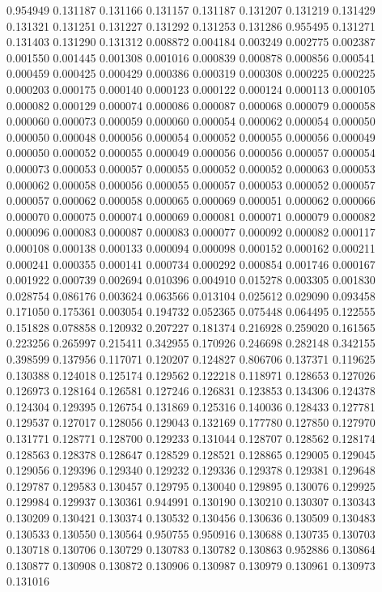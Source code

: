 0.954949
0.131187
0.131166
0.131157
0.131187
0.131207
0.131219
0.131429
0.131321
0.131251
0.131227
0.131292
0.131253
0.131286
0.955495
0.131271
0.131403
0.131290
0.131312
0.008872
0.004184
0.003249
0.002775
0.002387
0.001550
0.001445
0.001308
0.001016
0.000839
0.000878
0.000856
0.000541
0.000459
0.000425
0.000429
0.000386
0.000319
0.000308
0.000225
0.000225
0.000203
0.000175
0.000140
0.000123
0.000122
0.000124
0.000113
0.000105
0.000082
0.000129
0.000074
0.000086
0.000087
0.000068
0.000079
0.000058
0.000060
0.000073
0.000059
0.000060
0.000054
0.000062
0.000054
0.000050
0.000050
0.000048
0.000056
0.000054
0.000052
0.000055
0.000056
0.000049
0.000050
0.000052
0.000055
0.000049
0.000056
0.000056
0.000057
0.000054
0.000073
0.000053
0.000057
0.000055
0.000052
0.000052
0.000063
0.000053
0.000062
0.000058
0.000056
0.000055
0.000057
0.000053
0.000052
0.000057
0.000057
0.000062
0.000058
0.000065
0.000069
0.000051
0.000062
0.000066
0.000070
0.000075
0.000074
0.000069
0.000081
0.000071
0.000079
0.000082
0.000096
0.000083
0.000087
0.000083
0.000077
0.000092
0.000082
0.000117
0.000108
0.000138
0.000133
0.000094
0.000098
0.000152
0.000162
0.000211
0.000241
0.000355
0.000141
0.000734
0.000292
0.000854
0.001746
0.000167
0.001922
0.000739
0.002694
0.010396
0.004910
0.015278
0.003305
0.001830
0.028754
0.086176
0.003624
0.063566
0.013104
0.025612
0.029090
0.093458
0.171050
0.175361
0.003054
0.194732
0.052365
0.075448
0.064495
0.122555
0.151828
0.078858
0.120932
0.207227
0.181374
0.216928
0.259020
0.161565
0.223256
0.265997
0.215411
0.342955
0.170926
0.246698
0.282148
0.342155
0.398599
0.137956
0.117071
0.120207
0.124827
0.806706
0.137371
0.119625
0.130388
0.124018
0.125174
0.129562
0.122218
0.118971
0.128653
0.127026
0.126973
0.128164
0.126581
0.127246
0.126831
0.123853
0.134306
0.124378
0.124304
0.129395
0.126754
0.131869
0.125316
0.140036
0.128433
0.127781
0.129537
0.127017
0.128056
0.129043
0.132169
0.177780
0.127850
0.127970
0.131771
0.128771
0.128700
0.129233
0.131044
0.128707
0.128562
0.128174
0.128563
0.128378
0.128647
0.128529
0.128521
0.128865
0.129005
0.129045
0.129056
0.129396
0.129340
0.129232
0.129336
0.129378
0.129381
0.129648
0.129787
0.129583
0.130457
0.129795
0.130040
0.129895
0.130076
0.129925
0.129984
0.129937
0.130361
0.944991
0.130190
0.130210
0.130307
0.130343
0.130209
0.130421
0.130374
0.130532
0.130456
0.130636
0.130509
0.130483
0.130533
0.130550
0.130564
0.950755
0.950916
0.130688
0.130735
0.130703
0.130718
0.130706
0.130729
0.130783
0.130782
0.130863
0.952886
0.130864
0.130877
0.130908
0.130872
0.130906
0.130987
0.130979
0.130961
0.130973
0.131016
